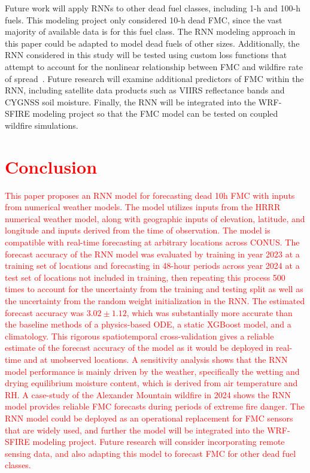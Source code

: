 \documentclass[fire,article,submit,pdftex,moreauthors]{Definitions/mdpi}
\begin{document}
Future work will apply RNNs to other dead fuel classes, including 1-h and 100-h fuels. This modeling project only considered 10-h dead FMC, since the vast majority of available data is for this fuel class. The RNN modeling approach in this paper could be adapted to model dead fuels of other sizes. Additionally, the RNN considered in this study will be tested using custom loss functions that attempt to account for the nonlinear relationship between FMC and wildfire rate of spread~\citep{Hirschi-2025-CLF}. Future research will examine additional predictors of FMC within the RNN, including satellite data products such as VIIRS reflectance bands and CYGNSS soil moisture. Finally, the RNN will be integrated into the WRF-SFIRE modeling project so that the FMC model can be tested on coupled wildfire simulations.
\section{\textcolor{red}{Conclusion}}
\textcolor{red}{This paper proposes an RNN model for forecasting dead 10h FMC with inputs from numerical weather models. The model utilizes inputs from the HRRR numerical weather model, along with geographic inputs of elevation, latitude, and longitude and inputs derived from the time of observation. The model is compatible with real-time forecasting at arbitrary locations across CONUS. The forecast accuracy of the RNN model was evaluated by training in year 2023 at a training set of locations and forecasting in 48-hour periods across year 2024 at a test set of locations not included in training, then repeating this process 500 times to account for the uncertainty from the training and testing split as well as the uncertainty from the random weight initialization in the RNN. The estimated forecast accuracy was $3.02\pm 1.12$, which was substantially more accurate than the baseline methods of a physics-based ODE, a static XGBoost model, and a climatology. This rigorous spatiotemporal cross-validation gives a reliable estimate of the forecast accuracy of the model as it would be deployed in real-time and at unobserved locations. A sensitivity analysis shows that the RNN model performance is mainly driven by the weather, specifically the wetting and drying equilibrium moisture content, which is derived from air temperature and RH. A case-study of the Alexander Mountain wildfire in 2024 shows the RNN model provides reliable FMC forecasts during periods of extreme fire danger. The RNN model could be deployed as an operational replacement for FMC sensors that are widely used, and further the model will be integrated into the WRF-SFIRE modeling project. Future research will consider incorporating remote sensing data, and also adapting this model to forecast FMC for other dead fuel classes.}
\vspace{6pt} 
\end{document}
